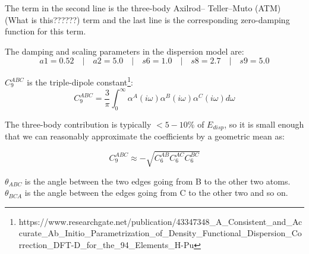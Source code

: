 \vspace{10pt}
\noindent
The term in the second line is the three-body Axilrod–
Teller–Muto (ATM) (What is this??????) term and the last line is the corresponding zero-damping function for this term.


\vspace{10pt}
\noindent
The damping and scaling parameters in the dispersion model are:
\[
  a1 = 0.52 \quad|\quad a2 = 5.0 \quad|\quad s6 = 1.0 \quad|\quad s8 = 2.7 \quad|\quad s9 = 5.0
\]


\vspace{10pt}
\noindent
\(C_9^{ABC}\) is the triple-dipole constant\footnote{\label{dft-d}https://www.researchgate.net/publication/43347348\_A\_Consistent\_and\_Accurate\_Ab\_Initio\_Parametrization\_of\_Density\_Functional\_Dispersion\_Correction\_DFT-D\_for\_the\_94\_Elements\_H-Pu}:
\begin{equation}
  C_9^{ABC} = \frac{3}{\pi} \int_0^\infty \alpha^A(i\omega) \alpha^B(i\omega)\alpha^C(i\omega)d\omega
\end{equation}

\vspace{10pt}
\noindent
The three-body contribution is typically \(<5-10\%\) of \(E_{disp}\), so it is small enough that we can reasonably approximate the coefficients by a geometric mean as:

\begin{equation}
  C_9^{ABC} \approx -\sqrt{C_6^{AB} C_6^{AC} C_6^{BC}}
\end{equation}


\vspace{10pt}
\noindent
\(\theta_{ABC}\) is the angle between the two edges going from B to the other two atoms. \(\theta_{BCA}\) is the angle between the edges going from C to the other two and so on.
